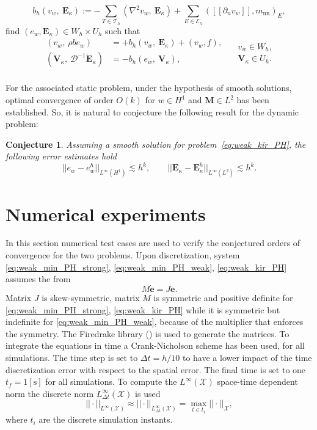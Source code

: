 \documentclass{ifacconf}
\newtheorem{conjecture}{Conjecture}
\begin{document}
\[
b_h(v_w, \ \bm{E}_{\kappa}) := - \sum_{T \in \mathcal{T}_h} ( \nabla^2 v_w, \ \bm{E}_\kappa) + \sum_{E \in \mathcal{E}_h} ([\![\partial_n v_w]\!], m_{\text{nn}})_{E}, 
\]
find $(e_w, \bm{E}_\kappa) \in W_h \times U_h$ such that
\begin{equation}
\label{eq:weak_kir_PH}
\begin{aligned}
(v_w, \ \rho b \dot{e}_w) &= +b_h(v_w, \ \bm{E}_{\kappa}) + (v_w, f), \\ 
(\bm{V}_\kappa, \ \mathcal{D}^{-1} \dot{\bm{E}}_\kappa) &= -b_h(e_w, \ \bm{V}_{\kappa}), \\ 
\end{aligned} \quad
\begin{aligned}
v_w \in W_h, \\
\bm{V}_\kappa \in U_h. \\
\end{aligned}
\end{equation}

For the associated static problem, under the hypothesis of smooth solutions, optimal convergence of order $O(k)$ for $w \in H^1$ and $\bm{M} \in L^2$ has been established. So, it is natural to conjecture the following result for the dynamic problem:
\begin{conjecture}
Assuming a smooth solution for problem~\eqref{eq:weak_kir_PH}, the following error estimates hold
\begin{equation}
\label{eq:errHHJ}
||e_w - e_w^h||_{L^{\infty} (H^1)} \lesssim h^{k}, \qquad
||\bm{E}_\kappa - \bm{E}_\kappa^h||_{L^{\infty} (L^2)} \lesssim h^{k}.
\end{equation}
\end{conjecture}


\section{Numerical experiments}
\label{sec:numerics}
In this section numerical test cases are used to verify the conjectured orders of convergence for the two problems. Upon discretization, system \eqref{eq:weak_min_PH_strong}, \eqref{eq:weak_min_PH_weak}, \eqref{eq:weak_kir_PH} assumes the from 
\[
M \dot{\bm{e}} = J \bm{e}.
\]
Matrix $J$ is skew-symmetric, matrix $M$ is symmetric and positive definite for \eqref{eq:weak_min_PH_strong}, \eqref{eq:weak_kir_PH} while it is symmetric but indefinite for \eqref{eq:weak_min_PH_weak}, because of the multiplier that enforces the symmetry. The Firedrake library (\cite{rathgeber2017firedrake}) is used to generate the matrices. To integrate the equations in time a Crank-Nicholson scheme has been used, for all simulations. The time step is set to $\Delta t = h/10$ to have a lower impact of the time discretization error with respect to the spatial error. The final time is set to one $t_f = 1 [\textrm{s}]$ for all simulations. To compute the $L^\infty (\mathcal{X})$ space-time dependent norm  the discrete norm $L^\infty_{\Delta t} (\mathcal{X})$ is used
\[
||\cdot ||_{L^\infty (\mathcal{X})} \approx || \cdot ||_{L^\infty_{\Delta t} (\mathcal{X})} = \max_{t \in t_i} ||\cdot||_{\mathcal{X}},
\]
where $t_i$ are the discrete simulation instants. 
\end{document}
